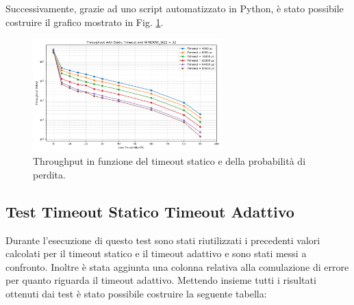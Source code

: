 Successivamente, grazie ad uno script automatizzato in Python, è stato possibile costruire il grafico mostrato in Fig. \ref{fig:throughput_static}.

\begin{figure}[htbp]
    \centering
    \includegraphics[width=0.65\textwidth]{imgs/04/static-timeout-performance.png}
    \caption{Throughput in funzione del timeout statico e della probabilità di perdita.}
    \label{fig:throughput_static}
\end{figure}

\subsection{Test Timeout Statico  Timeout Adattivo}
Durante l'esecuzione di questo test sono stati riutilizzati i precedenti valori calcolati per il timeout statico e il timeout adattivo e sono stati messi a confronto.
Inoltre è stata aggiunta una colonna relativa alla comulazione di errore per quanto riguarda il timeout adattivo.
Mettendo insieme tutti i risultati ottenuti dai test è stato possibile costruire la seguente tabella:

